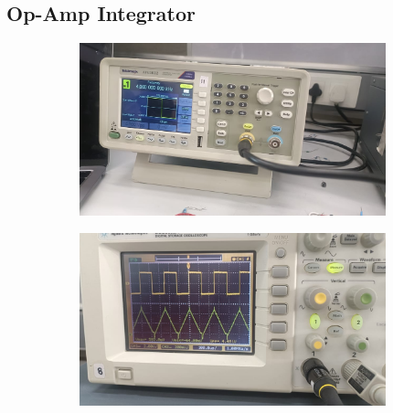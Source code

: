 \documentclass[a4paper,12pt]{article}
\begin{document}
\subsection*{Op-Amp Integrator}
\begin{figure}[H]
    \centering
    \begin{subfigure}{0.5\textwidth}
        \centering
        \includegraphics[height=5cm]{figs/5.2/para.jpeg}
    \end{subfigure}%
    \begin{subfigure}{0.5\textwidth}
        \centering
        \includegraphics[height=5cm]{figs/5.2/plot.jpeg}
    \end{subfigure}
\end{figure}
\end{document}

